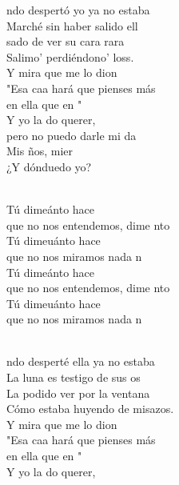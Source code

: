 \begin{cancion}%
	ndo despertó yo ya no estaba\\
	Marché sin haber salido ell\\
	sado de ver su cara rara\\
	Salimo' perdiéndono' loss.\\
\jump
	Y mira que me lo dion\\
	"Esa caa hará que pienses más \\
	en ella que en "\\
	Y yo la do querer, \\
	pero no puedo darle mi da\\
	Mis ños, mier\\
	¿Y dónduedo yo?\\\jump\\
	\begin{chorus}%
	Tú dimeánto hace \\
	que no nos entendemos, dime nto \\
	Tú dimeuánto hace  \\
	que no nos miramos nada n\\
	Tú dimeánto hace  \\
	que no nos entendemos, dime nto \\
	Tú dimeuánto hace  \\
	que no nos miramos nada n\\
	\end{chorus}%
	\jump\\
	ndo desperté ella ya no estaba\\
	La luna es testigo de sus os\\
	La podido ver por la ventana\\
	Cómo estaba huyendo de misazos.\\
\jump
	Y mira que me lo dion\\
	"Esa caa hará que pienses más \\
	en ella que en "\\
	Y yo la do querer, \\

\end{cancion}
